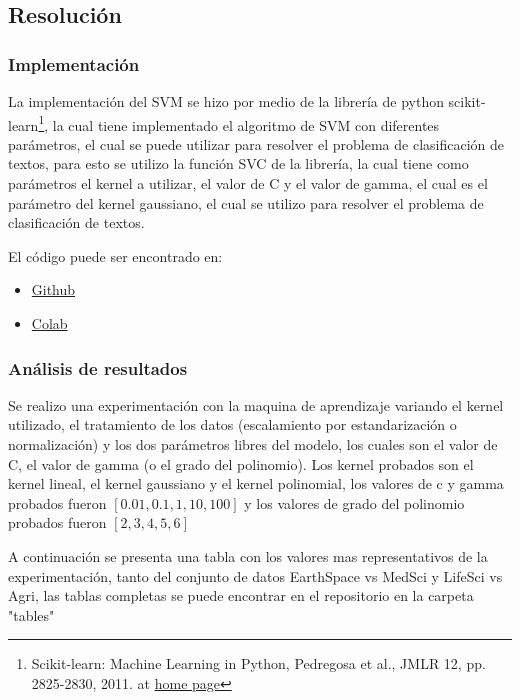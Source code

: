 \documentclass{article}
\theoremstyle{mytheoremstyle}
\theoremstyle{mytheoremstyle}
\theoremstyle{myproblemstyle}
\begin{document}
\subsection*{Resolución}

\subsubsection*{Implementación}

La implementación del SVM se hizo por medio de la librería de python scikit-learn\footnote{Scikit-learn: Machine Learning in Python, Pedregosa et al., JMLR 12, pp. 2825-2830, 2011. at \href{https://scikit-learn.org/stable/index.html}{home page} }, la cual tiene implementado el algoritmo de SVM con diferentes parámetros, el cual se puede utilizar para resolver el problema de clasificación de textos, para esto se utilizo la función SVC de la librería, la cual tiene como parámetros el kernel a utilizar, el valor de C y el valor de gamma, el cual es el parámetro del kernel gaussiano, el cual se utilizo para resolver el problema de clasificación de textos.

El código puede ser encontrado en:

\begin{itemize}
  \item \href{https://github.com/LeoGCode/Tarea-5--RBF_SVM}{Github}
  \item \href{https://colab.research.google.com/drive/1HszLnR5Vs49-ocRHY8iSkUpMqIE4EMVS?usp=sharing}{Colab}
\end{itemize}

\subsubsection*{Análisis de resultados}

Se realizo una experimentación con la maquina de aprendizaje variando el kernel utilizado, el tratamiento de los datos (escalamiento por estandarización o normalización) y los dos parámetros libres del modelo, los cuales son el valor de C, el valor de gamma (o el grado del polinomio). Los kernel probados son el kernel lineal, el kernel gaussiano y el kernel polinomial, los valores de c y gamma probados fueron $[0.01, 0.1, 1, 10, 100]$ y los valores de grado del polinomio probados fueron $[2, 3, 4, 5, 6]$

A continuación se presenta una tabla con los valores mas representativos de la experimentación, tanto del conjunto de datos EarthSpace vs MedSci y LifeSci vs Agri, las tablas completas se puede encontrar en el repositorio en la carpeta "tables"
\end{document}
